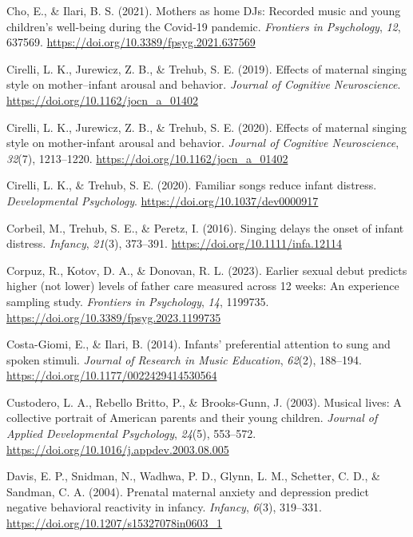 \documentclass[
]{article}
\newlength{\cslhangindent}
\newenvironment{CSLReferences}[2] %
 {\begin{list}{}{%
  \setlength{\itemindent}{0pt}
  \setlength{\leftmargin}{0pt}
  \setlength{\parsep}{0pt}
  \ifodd #1
   \setlength{\leftmargin}{\cslhangindent}
   \setlength{\itemindent}{-1\cslhangindent}
  \fi
  \setlength{\itemsep}{#2\baselineskip}}}
 {\end{list}}
\begin{document}
\begin{CSLReferences}{1}{0}
Cho, E., \& Ilari, B. S. (2021). Mothers as home {DJs}: {Recorded} music
and young children's well-being during the {Covid}-19 pandemic.
\emph{Frontiers in Psychology}, \emph{12}, 637569.
\url{https://doi.org/10.3389/fpsyg.2021.637569}

Cirelli, L. K., Jurewicz, Z. B., \& Trehub, S. E. (2019). Effects of
maternal singing style on mother--infant arousal and behavior.
\emph{Journal of Cognitive Neuroscience}.
\url{https://doi.org/10.1162/jocn_a_01402}

Cirelli, L. K., Jurewicz, Z. B., \& Trehub, S. E. (2020). Effects of
maternal singing style on mother-infant arousal and behavior.
\emph{Journal of Cognitive Neuroscience}, \emph{32}(7), 1213--1220.
\url{https://doi.org/10.1162/jocn_a_01402}

Cirelli, L. K., \& Trehub, S. E. (2020). Familiar songs reduce infant
distress. \emph{Developmental Psychology}.
\url{https://doi.org/10.1037/dev0000917}

Corbeil, M., Trehub, S. E., \& Peretz, I. (2016). Singing delays the
onset of infant distress. \emph{Infancy}, \emph{21}(3), 373--391.
\url{https://doi.org/10.1111/infa.12114}

Corpuz, R., Kotov, D. A., \& Donovan, R. L. (2023). Earlier sexual debut
predicts higher (not lower) levels of father care measured across 12
weeks: An experience sampling study. \emph{Frontiers in Psychology},
\emph{14}, 1199735. \url{https://doi.org/10.3389/fpsyg.2023.1199735}

Costa-Giomi, E., \& Ilari, B. (2014). Infants' preferential attention to
sung and spoken stimuli. \emph{Journal of Research in Music Education},
\emph{62}(2), 188--194. \url{https://doi.org/10.1177/0022429414530564}

Custodero, L. A., Rebello Britto, P., \& Brooks-Gunn, J. (2003). Musical
lives: {A} collective portrait of {American} parents and their young
children. \emph{Journal of Applied Developmental Psychology},
\emph{24}(5), 553--572.
\url{https://doi.org/10.1016/j.appdev.2003.08.005}

Davis, E. P., Snidman, N., Wadhwa, P. D., Glynn, L. M., Schetter, C. D.,
\& Sandman, C. A. (2004). Prenatal maternal anxiety and depression
predict negative behavioral reactivity in infancy. \emph{Infancy},
\emph{6}(3), 319--331. \url{https://doi.org/10.1207/s15327078in0603_1}


\end{CSLReferences}
\end{document}
